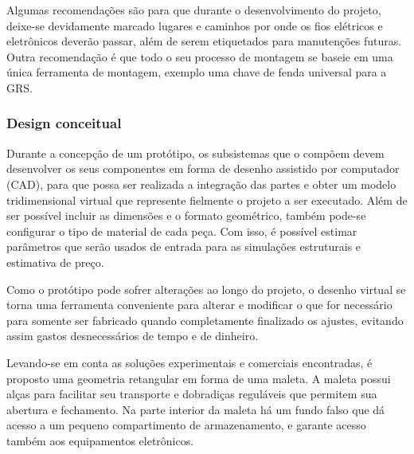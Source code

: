 \par Algumas recomendações são para que durante o desenvolvimento do projeto, deixe-se devidamente marcado lugares e caminhos por onde os fios elétricos e eletrônicos deverão passar, além de serem etiquetados para manutenções futuras. Outra recomendação é que todo o seu processo de montagem se baseie em uma única ferramenta de montagem, exemplo uma chave de fenda universal para a GRS.

\subsubsection{Design conceitual}

\par Durante a concepção de um protótipo, os subsistemas que o compõem devem desenvolver os seus componentes em forma de desenho assistido por computador (CAD), para que possa ser realizada a integração das partes e obter um modelo tridimensional virtual que represente fielmente o projeto a ser executado. Além de ser possível incluir as dimensões e o formato geométrico, também pode-se configurar o tipo de material de cada peça. Com isso, é possível estimar parâmetros que serão usados de entrada para as simulações estruturais e  estimativa de preço.

\par Como o protótipo pode sofrer alterações ao longo do projeto, o desenho virtual se torna uma ferramenta conveniente para alterar e modificar o que for necessário para somente ser fabricado quando completamente finalizado os ajustes, evitando assim gastos desnecessários de tempo e de dinheiro.   

\par Levando-se em conta as soluções experimentais e comerciais encontradas, é proposto uma geometria retangular em forma de uma maleta. A maleta possui alças para facilitar seu transporte e dobradiças reguláveis que permitem sua abertura e fechamento. Na parte interior da maleta há um fundo falso que dá acesso a um pequeno compartimento de armazenamento, e garante acesso também aos equipamentos eletrônicos.

